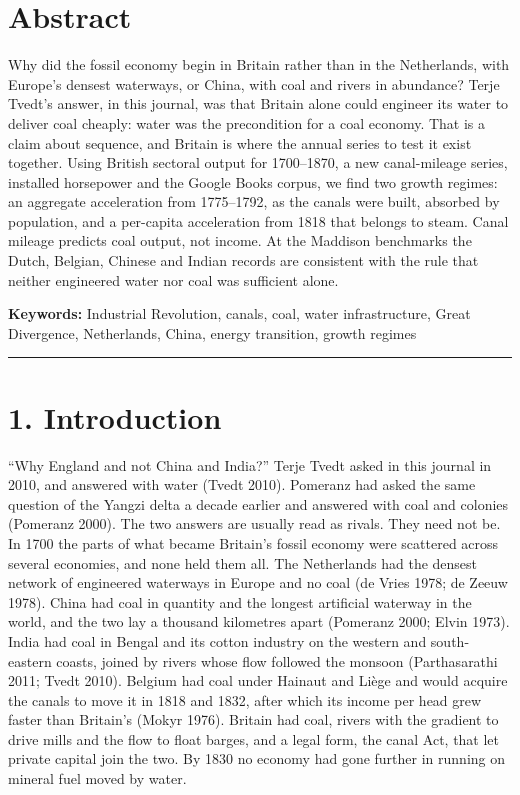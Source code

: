 \documentclass[
  11pt,
]{article}
\author{}
\date{}
\newcounter{none} %
\begin{document}
\section{Abstract}\label{abstract}

Why did the fossil economy begin in Britain rather than in the
Netherlands, with Europe's densest waterways, or China, with coal and
rivers in abundance? Terje Tvedt's answer, in this journal, was that
Britain alone could engineer its water to deliver coal cheaply: water
was the precondition for a coal economy. That is a claim about sequence,
and Britain is where the annual series to test it exist together. Using
British sectoral output for 1700--1870, a new canal-mileage series,
installed horsepower and the Google Books corpus, we find two growth
regimes: an aggregate acceleration from 1775--1792, as the canals were
built, absorbed by population, and a per-capita acceleration from 1818
that belongs to steam. Canal mileage predicts coal output, not income.
At the Maddison benchmarks the Dutch, Belgian, Chinese and Indian
records are consistent with the rule that neither engineered water nor
coal was sufficient alone.

\textbf{Keywords:} Industrial Revolution, canals, coal, water
infrastructure, Great Divergence, Netherlands, China, energy transition,
growth regimes

\begin{center}\rule{0.5\linewidth}{0.5pt}\end{center}

\section{1. Introduction}\label{introduction}

``Why England and not China and India?'' Terje Tvedt asked in this
journal in 2010, and answered with water (Tvedt 2010). Pomeranz had
asked the same question of the Yangzi delta a decade earlier and
answered with coal and colonies (Pomeranz 2000). The two answers are
usually read as rivals. They need not be. In 1700 the parts of what
became Britain's fossil economy were scattered across several economies,
and none held them all. The Netherlands had the densest network of
engineered waterways in Europe and no coal (de Vries 1978; de Zeeuw
1978). China had coal in quantity and the longest artificial waterway in
the world, and the two lay a thousand kilometres apart (Pomeranz 2000;
Elvin 1973). India had coal in Bengal and its cotton industry on the
western and south-eastern coasts, joined by rivers whose flow followed
the monsoon (Parthasarathi 2011; Tvedt 2010). Belgium had coal under
Hainaut and Liège and would acquire the canals to move it in 1818 and
1832, after which its income per head grew faster than Britain's (Mokyr
1976). Britain had coal, rivers with the gradient to drive mills and the
flow to float barges, and a legal form, the canal Act, that let private
capital join the two. By 1830 no economy had gone further in running on
mineral fuel moved by water.
\end{document}
